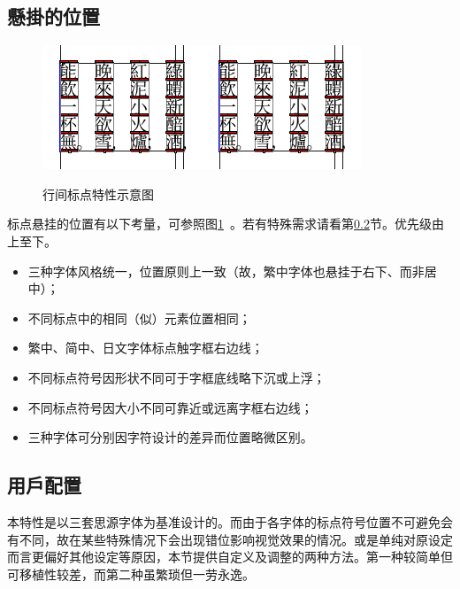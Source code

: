 \documentclass[twoside]{ltjsarticle}
\def\空{\quad}
\begin{document}
\subsection{懸掛的位置}
\begin{figure}[htb]
    \centering
    \includegraphics[height = 12\zh]{figure/fig-tc.pdf}\空\includegraphics[height = 12\zh]{figure/fig-jp.pdf}
    \caption{行间标点特性示意图}
    \label{fig:lgp}
\end{figure}
标点悬挂的位置有以下考量，可参照图\ref{fig:lgp}~。若有特殊需求请看第\ref{sec:config}节。优先级由上至下。
\begin{itemize}
    \item 三种字体风格统一，位置原则上一致（故，繁中字体也悬挂于右下、而非居中）；
    \item 不同标点中的相同（似）元素位置相同；
    \item 繁中、简中、日文字体标点触字框右边线；
    \item 不同标点符号因形状不同可于字框底线略下沉或上浮；
    \item 不同标点符号因大小不同可靠近或远离字框右边线；
    \item 三种字体可分别因字符设计的差异而位置略微区别。
\end{itemize}

\subsection{用戶配置}
\label{sec:config}
本特性是以三套思源字体为基准设计的。而由于各字体的标点符号位置不可避免会有不同，故在某些特殊情况下会出现错位影响视觉效果的情况。或是单纯对原设定而言更偏好其他设定等原因，本节提供自定义及调整的两种方法。第一种较简单但可移植性较差，而第二种虽繁琐但一劳永逸。
\end{document}
